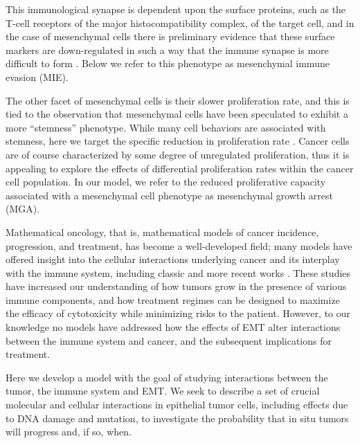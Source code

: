 \documentclass[11pt]{article}
\begin{document}
This immunological synapse is dependent upon the surface proteins, such as the T-cell receptors of the major histocompatibility complex, of the target cell, and in the case of mesenchymal cells there is preliminary evidence that these surface markers are down-regulated in such a way that the immune synapse is more difficult to form \cite{terry2017new}.
Below we refer to this phenotype as mesenchymal immune evasion (MIE).
%
\par
The other facet of mesenchymal cells is their slower proliferation rate, and this is tied to the observation that mesenchymal cells have been speculated to exhibit a more ``stemness'' phenotype.
While many cell behaviors are associated with stemness, here we target the specific reduction in proliferation rate \cite{woods2014effects}.
Cancer cells are of course characterized by some degree of unregulated proliferation, thus it is appealing to explore the effects of differential proliferation rates within the cancer cell population.
In our model, we refer to the reduced proliferative capacity associated with a mesenchymal cell phenotype as mesenchymal growth arrest (MGA).
\par
Mathematical oncology, that is, mathematical models of cancer incidence, progression, and treatment, has become a well-developed field; many models have offered insight into the cellular interactions underlying cancer and its interplay with the immune system, including classic \cite{anderson98_continuous, sherrattjonathana.92_oncogenes, pillis05_validated} and more recent works \cite{kim18_cell, gallaher14_bridging, gallaher18_spatial, an15_agentbased, serre16_mathematical, louzoun14_mathematical, briones-orta13_arkadia, lavi13_role, greene15_modeling, greene16_mathematical, cho17_modeling-1,  benzekry17_mathematical, owen11_mathematical, west18_multidrug}. These studies have increased our understanding of how tumors grow in the presence of various immune components, and how treatment regimes can be designed to maximize the efficacy of cytotoxicity while minimizing risks to the patient. However, to our knowledge no models have addressed how the effects of EMT alter interactions between the immune system and cancer, and the subsequent implications for treatment. 
\par
Here we develop a model with the goal of studying interactions between the tumor, the immune system and EMT.
We seek to describe a set of crucial molecular and cellular interactions in epithelial tumor cells, including effects due to DNA damage and mutation, to investigate the probability that in situ tumors will progress and, if so, when.
\end{document}
